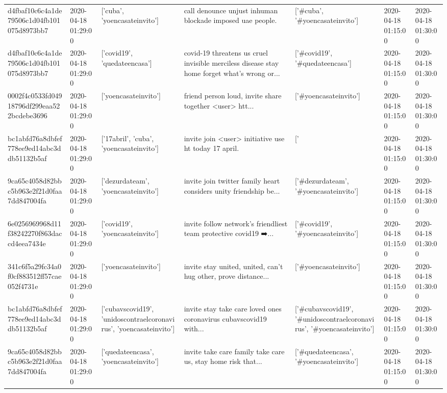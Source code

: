 \begin{tabular}{lllllll}
d4fbaf10c6c4a1de79506c1d04fb101075d8973bb7 & 2020-04-18 01:29:00 & ['cuba', 'yoencasateinvito'] & call denounce unjust inhuman blockade imposed uae people. & ['#cuba', '#yoencasateinvito'] & 2020-04-18 01:15:00 & 2020-04-18 01:30:00 \\
d4fbaf10c6c4a1de79506c1d04fb101075d8973bb7 & 2020-04-18 01:29:00 & ['covid19', 'quedateencasa'] & covid-19 threatens us cruel invisible merciless disease stay home forget what's wrong or... & ['#covid19', '#quedateencasa'] & 2020-04-18 01:15:00 & 2020-04-18 01:30:00 \\
0002f4c0533fd04918796df299eaa522bcdebe3696 & 2020-04-18 01:29:00 & ['yoencasateinvito'] & friend person loud, invite share together <user> htt... & ['#yoencasateinvito'] & 2020-04-18 01:15:00 & 2020-04-18 01:30:00 \\
bc1abfd76a8dbfef778ee9ed14abc3ddb51132b5af & 2020-04-18 01:29:00 & ['17abril', 'cuba', 'yoencasateinvito'] & invite join <user> initiative use ht today 17 april. & ['#17abril', '#cuba', '#yoencasateinvito'] & 2020-04-18 01:15:00 & 2020-04-18 01:30:00 \\
9ca65c4058d82bbc5b963e2f21d0faa7dd847004fa & 2020-04-18 01:29:00 & ['dezurdateam', 'yoencasateinvito'] & invite join twitter family heart considers unity friendship be... & ['#dezurdateam', '#yoencasateinvito'] & 2020-04-18 01:15:00 & 2020-04-18 01:30:00 \\
6e0256969968d11f38242270f863daccd4eea7434e & 2020-04-18 01:29:00 & ['covid19', 'yoencasateinvito'] & invite follow network's friendliest team protective covid19 ➡️... & ['#covid19', '#yoencasateinvito'] & 2020-04-18 01:15:00 & 2020-04-18 01:30:00 \\
341c6f5a29fc34a0f0cf883512ff57cae052f4731e & 2020-04-18 01:29:00 & ['yoencasateinvito'] & invite stay united, united, can't hug other, prove distance... & ['#yoencasateinvito'] & 2020-04-18 01:15:00 & 2020-04-18 01:30:00 \\
bc1abfd76a8dbfef778ee9ed14abc3ddb51132b5af & 2020-04-18 01:29:00 & ['cubavscovid19', 'unidoscontraelcoronavirus', 'yoencasateinvito'] & invite stay take care loved ones coronavirus cubavscovid19 with... & ['#cubavscovid19', '#unidoscontraelcoronavirus', '#yoencasateinvito'] & 2020-04-18 01:15:00 & 2020-04-18 01:30:00 \\
9ca65c4058d82bbc5b963e2f21d0faa7dd847004fa & 2020-04-18 01:29:00 & ['quedateencasa', 'yoencasateinvito'] & invite take care family take care us, stay home risk that... & ['#quedateencasa', '#yoencasateinvito'] & 2020-04-18 01:15:00 & 2020-04-18 01:30:00 \\

\end{tabular}
